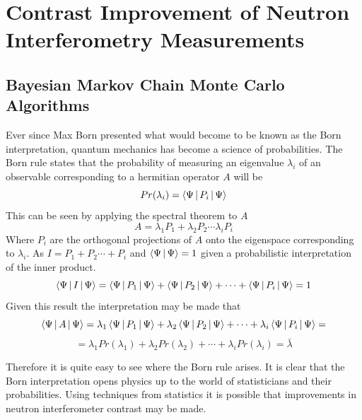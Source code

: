 \chapter{Contrast Improvement of Neutron Interferometry Measurements} %
\label{Chapter3}

\section{Bayesian Markov Chain Monte Carlo Algorithms}
Ever since Max Born presented what would become to be known as the Born interpretation, quantum mechanics has become a science of probabilities. The Born rule states that the probability of measuring an eigenvalue $\lambda_i$  of an observable corresponding to a hermitian operator $A$  will be 
\begin{equation}
Pr(\lambda_i) = \Braket{\Psi|P_i|\Psi}
\label{eq:bornrule}
\end{equation}
This can be seen by applying the spectral theorem to $A$\cite{linear}
\begin{equation}
A = \lambda_1 P_1 + \lambda_2 P_2 \cdots \lambda_i P_i
\end{equation}
Where $P_i$ are the orthogonal projections of $A$ onto the eigenspace corresponding to $\lambda_i$. As $I = P_1 + P_2 \cdots + P_i$ and $\Braket{\Psi|\Psi} = 1$ given a probabilistic interpretation of the inner product. 
\begin{equation}
\Braket{\Psi|I|\Psi} =\Braket{\Psi|P_1|\Psi} + \Braket{\Psi|P_2|\Psi} + \cdots +\Braket{\Psi|P_i|\Psi}  = 1
\end{equation}
Given this result the interpretation may be made that
\begin{equation*}
\Braket{\Psi|A|\Psi} = \lambda_1 \Braket{\Psi|P_1|\Psi} + \lambda_2\Braket{\Psi|P_2|\Psi} + \cdots +\lambda_i\Braket{\Psi|P_i|\Psi} =
\end{equation*}
\begin{equation}
=\lambda_1 Pr(\lambda_1) + \lambda_2 Pr(\lambda_2) + \cdots +\lambda_i Pr(\lambda_i) = \bar{\lambda} 
\label{eq:quantumExpectation}
\end{equation}

Therefore it is quite easy to see where the Born rule arises. It is clear that the Born interpretation opens physics up to the world of statisticians and their probabilities. Using techniques from statistics it is possible that improvements in neutron interferometer contrast may be made. 
